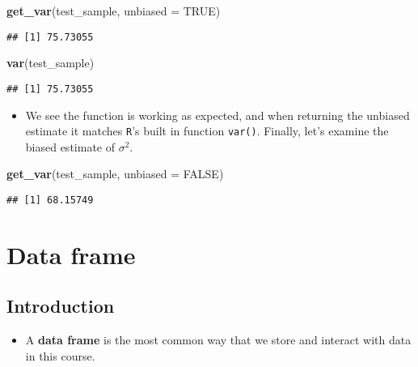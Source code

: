 \documentclass[]{book}
\newenvironment{Shaded}{\begin{snugshade}}{\end{snugshade}}
\newcommand{\DataTypeTok}[1]{\textcolor[rgb]{0.13,0.29,0.53}{#1}}
\newcommand{\KeywordTok}[1]{\textcolor[rgb]{0.13,0.29,0.53}{\textbf{#1}}}
\newcommand{\NormalTok}[1]{#1}
\newcommand{\OtherTok}[1]{\textcolor[rgb]{0.56,0.35,0.01}{#1}}
\providecommand{\tightlist}{%
  \setlength{\itemsep}{0pt}\setlength{\parskip}{0pt}}
\begin{document}
\begin{Shaded}
\begin{Highlighting}[]
\KeywordTok{get_var}\NormalTok{(test_sample, }\DataTypeTok{unbiased =} \OtherTok{TRUE}\NormalTok{)}
\end{Highlighting}
\end{Shaded}

\begin{verbatim}
## [1] 75.73055
\end{verbatim}

\begin{Shaded}
\begin{Highlighting}[]
\KeywordTok{var}\NormalTok{(test_sample)}
\end{Highlighting}
\end{Shaded}

\begin{verbatim}
## [1] 75.73055
\end{verbatim}

\begin{itemize}
\tightlist
\item
  We see the function is working as expected, and when returning the unbiased estimate it matches \texttt{R}'s built in function \texttt{var()}. Finally, let's examine the biased estimate of \(\sigma^2\).
\end{itemize}

\begin{Shaded}
\begin{Highlighting}[]
\KeywordTok{get_var}\NormalTok{(test_sample, }\DataTypeTok{unbiased =} \OtherTok{FALSE}\NormalTok{)}
\end{Highlighting}
\end{Shaded}

\begin{verbatim}
## [1] 68.15749
\end{verbatim}

\hypertarget{data-frame}{%
\chapter{Data frame}\label{data-frame}}

\hypertarget{introduction}{%
\section{Introduction}\label{introduction}}

\begin{itemize}
\tightlist
\item
  A \textbf{data frame} is the most common way that we store and interact with data in this course.
\end{itemize}
\end{document}
